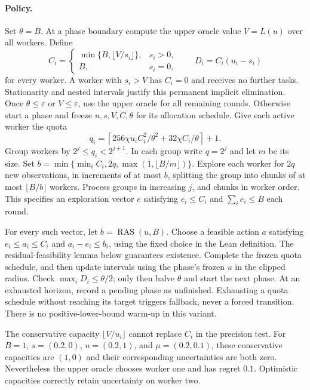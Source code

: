 \documentclass[11pt]{article}
\begin{document}
\paragraph{Policy.}
Set $\theta=B$. At a phase boundary compute the upper oracle value $V=L(u)$
over all workers. Define
\[
 C_i=\begin{cases}\min\{B,\lfloor V/s_i\rfloor\},&s_i>0,\\B,&s_i=0,\end{cases}
 \qquad D_i=C_i(u_i-s_i)
\]
for every worker. A worker with $s_i>V$ has $C_i=0$ and receives no further
tasks. Stationarity and nested intervals justify this permanent implicit elimination.
Once $\theta\le\varepsilon$ or $V\le\varepsilon$,
use the upper oracle for all remaining rounds. Otherwise start a phase and freeze
$u,s,V,C,\theta$ for its allocation schedule. Give each active worker the quota
\[
 q_i=\left\lceil256\chi u_iC_i^2/\theta^2+32\chi C_i/\theta\right\rceil+1.
\]
Group workers by $2^j\le q_i<2^{j+1}$. In each group write $q=2^j$ and let $m$
be its size. Set $b=\min\{\min_i C_i,2q,\max(1,\lfloor B/m\rfloor)\}$.
Explore each worker for $2q$ new observations, in increments of at most $b$,
splitting the group into chunks of at most $\lfloor B/b\rfloor$ workers.
Process groups in increasing $j$, and chunks in worker order. This specifies
an exploration vector $e$ satisfying $e_i\le C_i$ and $\sum_i e_i\le B$ each round.

For every such vector, let $b=\operatorname{RAS}(u,B)$. Choose a feasible action
$a$ satisfying $e_i\le a_i\le C_i$ and $a_i-e_i\le b_i$, using the fixed choice
in the Lean definition. The residual-feasibility lemma below guarantees existence.
Complete the frozen quota schedule, and then update intervals using the phase's
frozen $u$ in the clipped radius. Check $\max_i D_i\le\theta/2$; only then halve
$\theta$ and start the next phase.
At an exhausted horizon, record a pending phase as unfinished. Exhausting a quota
schedule without reaching its target triggers fallback, never a forced transition.
There is no positive-lower-bound warm-up in this variant.

The conservative capacity $\lfloor V/u_i\rfloor$ cannot replace $C_i$ in the
precision test. For $B=1$, $s=(0.2,0)$, $u=(0.2,1)$, and $\mu=(0.2,0.1)$,
these conservative capacities are $(1,0)$ and their corresponding uncertainties
are both zero. Nevertheless the upper oracle chooses worker one and has regret
$0.1$. Optimistic capacities correctly retain uncertainty on worker two.
\end{document}
